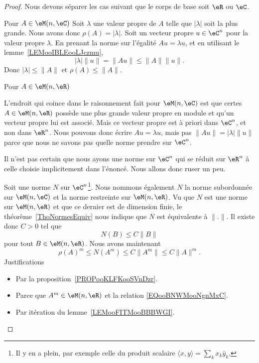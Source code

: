 \begin{proof}
    Nous devons séparer les cas suivant que le corps de base soit \( \eR\) ou \( \eC\).

    \begin{subproof}
        \item[Pour \( A\in \eM(n,\eC)\)]
            Soit \( \lambda\) une valeur propre de \( A\) telle que \( | \lambda |\) soit la plus grande. Nous avons donc \( \rho(A)=| \lambda |\). Soit un vecteur propre \( u\in \eC^n\) pour la valeur propre \( \lambda\). En prenant la norme sur l'égalité \( Au=\lambda u\), et en utilisant le lemme~\ref{LEMooIBLEooLJczmu},
            \begin{equation}
                | \lambda |\| u \|=\| Au \|\leq \| A \|\| u \|.
            \end{equation}
            Donc \( | \lambda |\leq \| A \|\) et \( \rho(A)\leq\| A \|\).

        \item[Pour \( A\in \eM(n,\eR)\)]

            L'endroit qui coince dans le raisonnement fait pour \( \eM(n,\eC)\) est que certes \( A\in \eM(n,\eR)\) possède une plus grande valeur propre en module et qu'un vecteur propre lui est associé. Mais ce vecteur propre est à priori dans \( \eC^n\), et non dans \( \eR^n\). Nous pouvons donc écrire \( Au=\lambda u\), mais pas \( \| Au \|=| \lambda |\| u \|\) parce que nous ne savons pas quelle norme prendre sur \( \eC^n\).

            Il n'est pas certain que nous ayons une norme sur \( \eC^n\) qui se réduit sur \( \eR^n\) à celle choisie implicitement dans l'énoncé. Nous allons donc ruser un peu.

            Soit une norme \( N\) sur \( \eC^n\)\footnote{Il y en a plein, par exemple celle du produit scalaire \( \langle x, y\rangle =\sum_kx_k\bar y_k\).}. Nous nommons également \( N\) la norme subordonnée sur \( \eM(n,\eC)\) et la norme restreinte sur \( \eM(n,\eR)\). Vu que \( N\) est une norme sur \( \eM(n,\eR)\) et que ce dernier est de dimension finie, le théorème~\ref{ThoNormesEquiv} nous indique que \( N\) est équivalente à \( \| . \|\). Il existe donc \( C>0\) tel que
            \begin{equation}        \label{EQooBNWMooNgnMxC}
                 N(B)\leq C\| B \|
            \end{equation}
            pour tout \( B\in \eM(n,\eR)\). Nous avons maintenant
            \begin{equation}
                \rho(A)^m\leq N(A^m)\leq C\| A^m \|\leq C\| A \|^m.
            \end{equation}
            Justifications
            \begin{itemize}
                \item Par la proposition~\ref{PROPooKLFKooSVnDzr}.
                \item Parce que \( A^m\in \eM(n,\eR)\) et la relation \eqref{EQooBNWMooNgnMxC}.
                \item Par itération du lemme~\ref{LEMooFITMooBBBWGI}.
            \end{itemize}


\end{subproof}
\end{proof}
